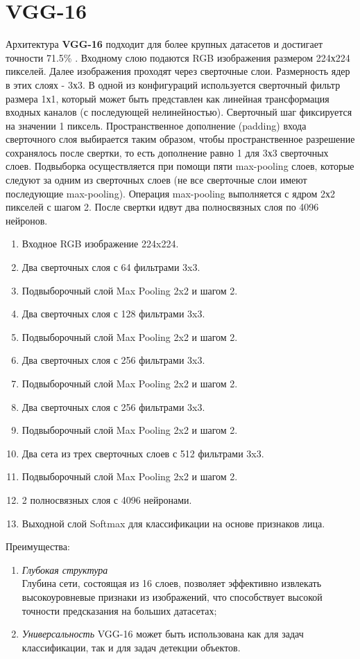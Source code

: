 \section{VGG-16}
Архитектура \textbf{VGG-16} подходит для более крупных датасетов и достигает точности 71.5\% \cite{vgg16}. Входному слою подаются RGB изображения размером 224х224 пикселей. Далее изображения проходят через сверточные слои. Размерность ядер в этих слоях - 3х3.
В одной из конфигураций используется сверточный фильтр размера 1х1, который может быть представлен как линейная трансформация входных каналов (с последующей нелинейностью). Сверточный шаг фиксируется на значении 1 пиксель. Пространственное дополнение (padding) входа сверточного слоя выбирается таким образом, чтобы пространственное разрешение сохранялось после свертки, то есть дополнение равно 1 для 3х3 сверточных слоев. Подвыборка осуществляется при помощи пяти max-pooling слоев, которые следуют за одним из сверточных слоев (не все сверточные слои имеют последующие max-pooling). Операция max-pooling выполняется с ядром 2х2 пикселей с шагом 2. После свертки  идвут два полносвязных слоя по 4096 нейронов.
\begin{enumerate}
\item Входное RGB изображение 224x224.
\item Два сверточных слоя с 64 фильтрами 3x3.
\item Подвыборочный слой Max Pooling 2x2 и шагом 2.
\item Два сверточных слоя с 128 фильтрами 3x3.
\item Подвыборочный слой Max Pooling 2x2 и шагом 2.
\item Два сверточных слоя с 256 фильтрами 3x3.
\item Подвыборочный слой Max Pooling 2x2 и шагом 2.
\item Два сверточных слоя с 256 фильтрами 3x3.
\item Подвыборочный слой Max Pooling 2x2 и шагом 2.
\item Два сета из трех сверточных слоев с 512 фильтрами 3x3.
\item Подвыборочный слой Max Pooling 2x2 и шагом 2.
\item 2 полносвязных слоя с 4096 нейронами.
\item Выходной слой Softmax для классификации на основе признаков лица.
\end{enumerate}


Преимущества:
\begin{enumerate}
\item \textit{Глубокая структура} \\
Глубина сети, состоящая из 16 слоев, позволяет эффективно извлекать высокоуровневые признаки из изображений, что способствует высокой точности предсказания на больших датасетах;

\item \textit{Универсальность}
VGG-16 может быть использована как для задач классификации, так и для задач детекции объектов.
\end{enumerate}

